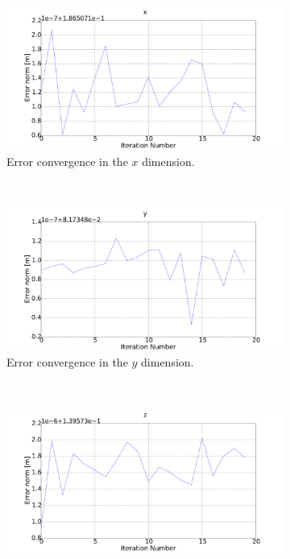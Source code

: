 \begin{figure}
  \centering
  \begin{subfigure}{0.45\textwidth}
    \includegraphics[width=\textwidth]{figures/chapter3/err_x}
    \caption{Error convergence in the $x$ dimension.}
\label{fig:err-convergence-x}
  \end{subfigure}
~
  \begin{subfigure}{0.45\textwidth}
    \includegraphics[width=\textwidth]{figures/chapter3/err_y}
    \caption{Error convergence in the $y$ dimension.}
\label{fig:err-convergence-y}
  \end{subfigure}
~
\begin{subfigure}{0.45\textwidth}
    \includegraphics[width=\textwidth]{figures/chapter3/err_z}

\end{subfigure}
\end{figure}

